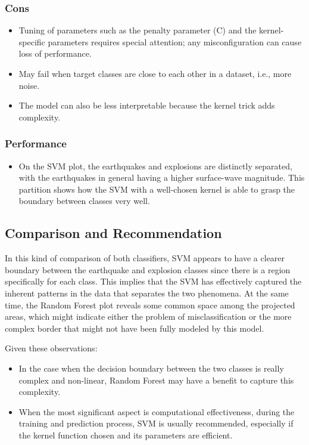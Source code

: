 \documentclass[
]{article}
\providecommand{\tightlist}{%
  \setlength{\itemsep}{0pt}\setlength{\parskip}{0pt}}
\begin{document}
\subsubsection{Cons}\label{cons-1}

\begin{itemize}
\tightlist
\item
  Tuning of parameters such as the penalty parameter (C) and the
  kernel-specific parameters requires special attention; any
  misconfiguration can cause loss of performance.
\item
  May fail when target classes are close to each other in a dataset,
  i.e., more noise.
\item
  The model can also be less interpretable because the kernel trick adds
  complexity.
\end{itemize}

\subsubsection{Performance}\label{performance-1}

\begin{itemize}
\tightlist
\item
  On the SVM plot, the earthquakes and explosions are distinctly
  separated, with the earthquakes in general having a higher
  surface-wave magnitude. This partition shows how the SVM with a
  well-chosen kernel is able to grasp the boundary between classes very
  well.
\end{itemize}

\subsection{Comparison and
Recommendation}\label{comparison-and-recommendation}

In this kind of comparison of both classifiers, SVM appears to have a
clearer boundary between the earthquake and explosion classes since
there is a region specifically for each class. This implies that the SVM
has effectively captured the inherent patterns in the data that
separates the two phenomena. At the same time, the Random Forest plot
reveals some common space among the projected areas, which might
indicate either the problem of misclassification or the more complex
border that might not have been fully modeled by this model.

Given these observations:

\begin{itemize}
\tightlist
\item
  In the case when the decision boundary between the two classes is
  really complex and non-linear, Random Forest may have a benefit to
  capture this complexity.
\item
  When the most significant aspect is computational effectiveness,
  during the training and prediction process, SVM is usually
  recommended, especially if the kernel function chosen and its
  parameters are efficient.
\end{itemize}
\end{document}
